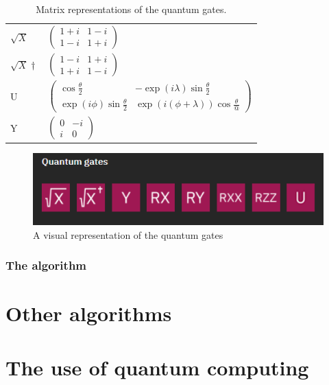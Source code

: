 \begin{table}[]
\begin{tabular}{l|l}
        $\sqrt{X}$                        & $\begin{pmatrix} 1+i&1-i                                                  \\ 1-i&1+i                                                                                                                                                                            \end{pmatrix}$ \\
        $\sqrt{X}\dagger$                 & $\begin{pmatrix} 1-i&1+i                                                  \\ 1+i&1-i                                                                                                                                                                            \end{pmatrix}$ \\
        U                                 & $\begin{pmatrix} \cos\frac{\theta}{2}&-\exp(i\lambda)\sin\frac{\theta}{2} \\ \exp(i\phi)\sin\frac{\theta}{2}&\exp(i(\phi+\lambda))\cos\frac{\theta}{@}                                                                                                          \end{pmatrix}$ \\
        Y                                 & $\begin{pmatrix} 0&-i \\ i&0                                                                                                                                                                                                                                    \end{pmatrix}$                                   
        \end{tabular}
        \caption{Matrix representations of the quantum gates.}
\end{table}

\begin{figure} [h]
    \centering
    \includegraphics[width=\textwidth]{img/quantum-gates.PNG}
        \caption{A visual representation of the quantum gates}
        \label{fig:quantum gates}
\end{figure}

\subsubsection{The algorithm}
\section{Other algorithms}
\label{sec:Other algorithms}
\section{The use of quantum computing}